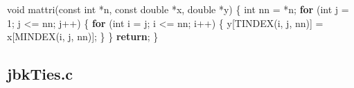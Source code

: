 \documentclass[
  12pt,
]{book}
\newenvironment{Shaded}{\begin{snugshade}}{\end{snugshade}}
\newcommand{\ControlFlowTok}[1]{\textcolor[rgb]{0.13,0.29,0.53}{\textbf{#1}}}
\newcommand{\DataTypeTok}[1]{\textcolor[rgb]{0.13,0.29,0.53}{#1}}
\newcommand{\DecValTok}[1]{\textcolor[rgb]{0.00,0.00,0.81}{#1}}
\newcommand{\NormalTok}[1]{#1}
\theoremstyle{definition}
\theoremstyle{definition}
\theoremstyle{definition}
\theoremstyle{definition}
\theoremstyle{remark}
\begin{document}
\begin{Shaded}
\begin{Highlighting}[]
\DataTypeTok{void}\NormalTok{ mattri(}\DataTypeTok{const} \DataTypeTok{int}\NormalTok{ *n, }\DataTypeTok{const} \DataTypeTok{double}\NormalTok{ *x, }\DataTypeTok{double}\NormalTok{ *y) \{}
    \DataTypeTok{int}\NormalTok{ nn = *n;}
    \ControlFlowTok{for}\NormalTok{ (}\DataTypeTok{int}\NormalTok{ j = }\DecValTok{1}\NormalTok{; j \textless{}= nn; j++) \{}
        \ControlFlowTok{for}\NormalTok{ (}\DataTypeTok{int}\NormalTok{ i = j; i \textless{}= nn; i++) \{}
\NormalTok{            y[TINDEX(i, j, nn)] = x[MINDEX(i, j, nn)];}
\NormalTok{        \}}
\NormalTok{    \}}
    \ControlFlowTok{return}\NormalTok{;}
\NormalTok{\}}
\end{Highlighting}
\end{Shaded}

\hypertarget{jbkties.c}{%
\subsection{jbkTies.c}\label{jbkties.c}}
\end{document}
